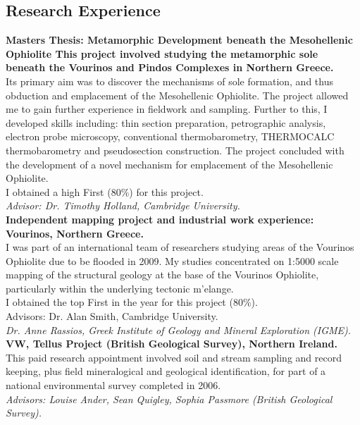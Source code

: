 \documentclass[10pt,a4paper]{article}
\newcommand{\years}[1]{\marginpar{\scriptsize #1 } }
\begin{document}
\subsection*{Research Experience}
\years{06/07-01/08}\textbf{Masters Thesis: Metamorphic Development beneath the Mesohellenic Ophiolite
This project involved studying the metamorphic sole beneath the Vourinos and Pindos Complexes in Northern Greece.}\\
Its primary aim was to discover the mechanisms of sole formation, and thus obduction and emplacement of the
Mesohellenic Ophiolite. The project allowed me to gain further experience in fieldwork and sampling. Further to this, I
developed skills including: thin section preparation, petrographic analysis, electron probe microscopy, conventional
thermobarometry, THERMOCALC thermobarometry and pseudosection construction. The project concluded with the
development of a novel mechanism for emplacement of the Mesohellenic Ophiolite.\\
I obtained a high First (80\%) for this project.\\
\emph{Advisor: Dr. Timothy Holland, Cambridge University.}\\
\years{06/06-01/07}\textbf{Independent mapping project and industrial work experience: Vourinos, Northern Greece.}\\
I was part of an international team of researchers studying areas of the Vourinos Ophiolite due to be flooded in 2009.
My studies concentrated on 1:5000 scale mapping of the structural geology at the base of the Vourinos Ophiolite,
particularly within the underlying tectonic m\a'{e}lange.\\
I obtained the top First in the year for this project (80\%).\\
Advisors: Dr. Alan Smith, Cambridge University.\\
\emph{Dr. Anne Rassios, Greek Institute of Geology and Mineral Exploration (IGME).}
\years{07/05-08/05}\textbf{VW, Tellus Project (British Geological Survey), Northern Ireland.}\\
This paid research appointment involved soil and stream sampling and record keeping, plus field mineralogical and
geological identification, for part of a national environmental survey completed in 2006.\\
\emph{Advisors: Louise Ander, Sean Quigley, Sophia Passmore (British Geological Survey).}

\vfill
\end{document}
